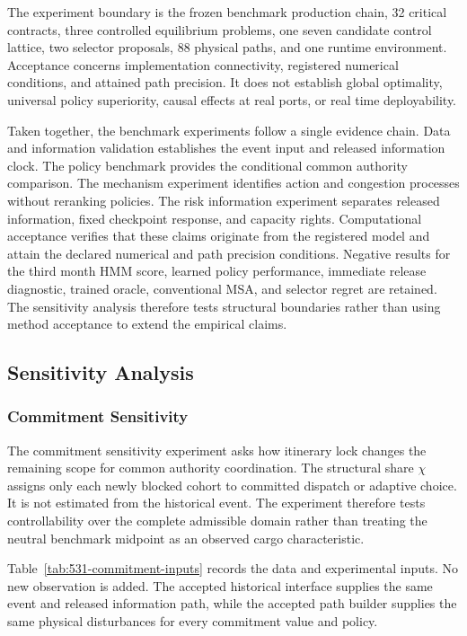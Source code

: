 \documentclass[a4paper,fleqn]{cas-sc}
\begin{document}
The experiment boundary is the frozen benchmark production chain, 32
critical contracts, three controlled equilibrium problems, one seven candidate
control lattice, two selector proposals, 88 physical paths, and one runtime
environment. Acceptance concerns implementation connectivity, registered
numerical conditions, and attained path precision. It does not establish
global optimality, universal policy superiority, causal effects at real ports,
or real time deployability.

Taken together, the benchmark experiments follow a single evidence chain. Data
and information validation establishes the event input and released information
clock. The policy benchmark provides the conditional common authority comparison.
The mechanism experiment identifies action and congestion processes without
reranking policies. The risk information experiment separates released
information, fixed checkpoint response, and capacity rights. Computational
acceptance verifies that these claims originate from the registered
model and attain the declared numerical and path precision conditions. Negative
results for the third month HMM score, learned policy performance, immediate
release diagnostic, trained oracle, conventional MSA, and selector regret are
retained. The sensitivity analysis therefore tests structural boundaries rather than using
method acceptance to extend the empirical claims.

\FloatBarrier
\subsection{Sensitivity Analysis}
\label{subsec:sensitivity-analysis}

\subsubsection{Commitment Sensitivity}
\label{subsubsec:commitment-sensitivity}

The commitment sensitivity experiment asks how itinerary lock changes the
remaining scope for common authority coordination. The structural share
$\chi$ assigns only each newly blocked cohort to committed dispatch or adaptive
choice. It is not estimated from the historical event. The experiment therefore
tests controllability over the complete admissible domain rather than treating
the neutral benchmark midpoint as an observed cargo characteristic.

Table~\ref{tab:531-commitment-inputs} records the data and experimental inputs.
No new observation is added. The accepted historical interface supplies the
same event and released information path, while the accepted path builder
supplies the same physical disturbances for every commitment value and policy.
\end{document}
